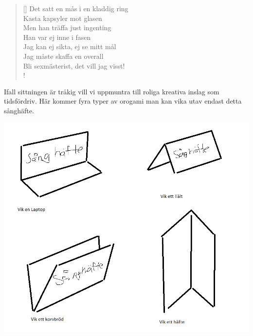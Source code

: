 \documentclass[11pt, a4paper]{memoir} %
\begin{document}
\begin{verse}[\versewidth]
Det satt en mås i en kladdig ring\\
Kasta kapsyler mot glasen\\
Men han träffa just ingenting\\
Han var ej inne i fasen\\
Jag kan ej sikta, ej se mitt mål\\
Jag måste skaffa en overall\\
Bli sexmästerist, det vill jag visst!\\!


\end{verse}

\newpage
\restoregeometry
\onecolumn

Ifall sittningen är tråkig vill vi uppmuntra till roliga kreativa inslag som tidsfördriv. Här kommer fyra typer av orogami man kan vika utav endast detta sånghäfte. 

\centering
    \includegraphics[width=\textwidth]{orogami}

\normalsize
\newpage
{}
\twocolumn



\settowidth{\versewidth}{Vi skall kröka så vi blöder} %
\end{document}
